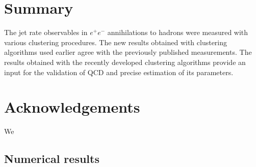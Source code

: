 \section{Summary}                      
\label{sec:summary}
The jet rate observables  in $e^+e^-$ 
annihilations to hadrons were measured with various clustering procedures.
The new results obtained with 
clustering algorithms  used earlier agree with the previously published measurements.
The results obtained with the recently developed clustering algorithms  
provide an input for the validation of QCD and precise estimation of its parameters.
%
\section*{Acknowledgements}
\label{sec:acknowledgements}
We
\FloatBarrier
\begin{appendices}
\section{Numerical results}
\label{sec:appendixA}


\renewcommand{\TABGFONTSIZE}{\scriptsize}
\newarray\TABGCAPTIONcorrected
{}
\newarray\TABGCAPTIONolddata
{}



\end{appendices}
